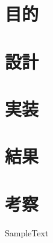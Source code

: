 \documentclass[a4paper]{jsarticle}
\begin{document}
\section{目的}
\section{設計}
\section{実装}
\section{結果}
\section{考察}

\begin{thebibliography}{99}
   SampleText
\end{thebibliography}
\end{document}
